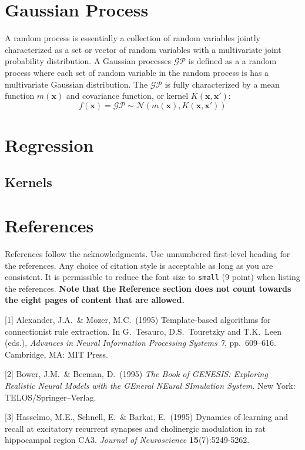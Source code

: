\documentclass{article}
\begin{document}
\section{Gaussian Process}
A random process is essentially a collection of random variables jointly characterized  as a set or vector of random variables with a multivariate joint probability distribution. A Gaussian processes $\mathcal{GP}$ is defined as a a random process where each set of random variable in the random process is has a multivariate Gaussian distribution. The $\mathcal{GP}$ is fully characterized by a mean function  $m(\boldsymbol{x})$ and covariance function, or kernel $K(\boldsymbol{x},\boldsymbol{x'})$:
\[f(\boldsymbol{x})=\mathcal{GP}\sim \mathcal{N}(m(\boldsymbol{x}),K(\boldsymbol{x},\boldsymbol{x'}))\]
\section{Regression}

\subsection{Kernels}


\section*{References}

References follow the acknowledgments. Use unnumbered first-level heading for
the references. Any choice of citation style is acceptable as long as you are
consistent. It is permissible to reduce the font size to \verb+small+ (9 point)
when listing the references.
{\bf Note that the Reference section does not count towards the eight pages of content that are allowed.}
\medskip

\small

[1] Alexander, J.A.\ \& Mozer, M.C.\ (1995) Template-based algorithms for
connectionist rule extraction. In G.\ Tesauro, D.S.\ Touretzky and T.K.\ Leen
(eds.), {\it Advances in Neural Information Processing Systems 7},
pp.\ 609--616. Cambridge, MA: MIT Press.

[2] Bower, J.M.\ \& Beeman, D.\ (1995) {\it The Book of GENESIS: Exploring
  Realistic Neural Models with the GEneral NEural SImulation System.}  New York:
TELOS/Springer--Verlag.

[3] Hasselmo, M.E., Schnell, E.\ \& Barkai, E.\ (1995) Dynamics of learning and
recall at excitatory recurrent synapses and cholinergic modulation in rat
hippocampal region CA3. {\it Journal of Neuroscience} {\bf 15}(7):5249-5262.
\end{document}
